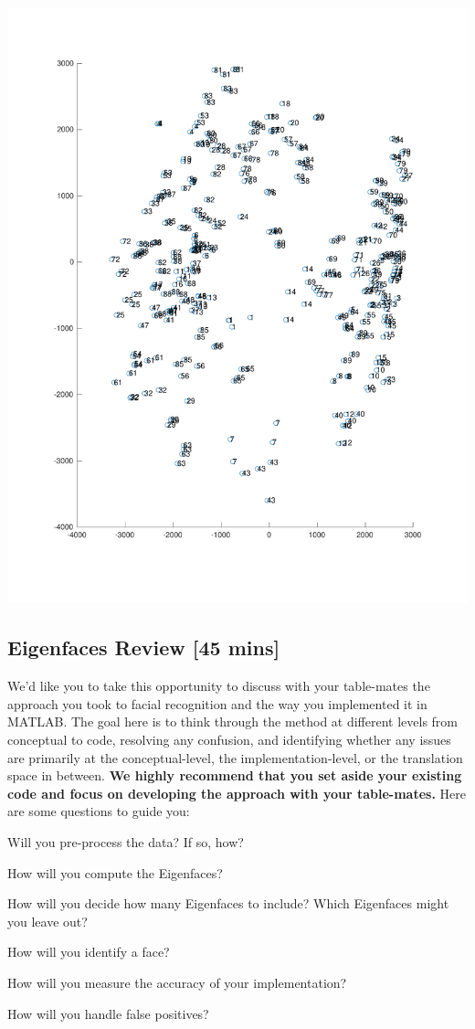\includegraphics[width=\linewidth]{FacesDay8/figs/facespace}

\subsection{Eigenfaces Review [45 mins]}

We'd like you to take this opportunity to discuss with your table-mates the approach you took to facial recognition and the way you implemented it in MATLAB. The goal here is to think through the method at different levels from conceptual to code, resolving any confusion, and identifying whether any issues are primarily at the conceptual-level, the implementation-level, or the translation space in between. \textbf{We highly recommend that you set aside your existing code and focus on developing the approach with your table-mates.} Here are some questions to guide you:
\bi
\item Will you pre-process the data? If so, how?
\item How will you compute the Eigenfaces?
\item How will you decide how many Eigenfaces to include? Which Eigenfaces might you leave out?
\item How will you identify a face?
\item How will you measure the accuracy of your implementation?
\item How will you handle false positives?
\ei

